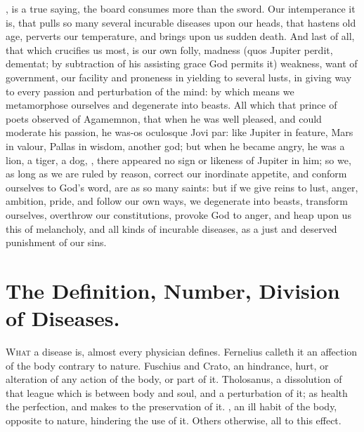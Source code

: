 {, is a true saying, the board consumes more
than the sword. Our intemperance it is, that pulls so many several
incurable diseases upon our heads, that hastens old age, perverts
our temperature, and brings upon us sudden death. And last of all, that
which crucifies us most, is our own folly, madness (quos Jupiter
perdit, dementat; by subtraction of his assisting grace God permits it)
weakness, want of government, our facility and proneness in yielding to
several lusts, in giving way to every passion and perturbation of the
mind: by which means we metamorphose ourselves and degenerate into
beasts. All which that prince of poets observed of Agamemnon, that
when he was well pleased, and could moderate his passion, he was-os
oculosque Jovi par: like Jupiter in feature, Mars in valour, Pallas in
wisdom, another god; but when he became angry, he was a lion, a tiger,
a dog, \etc{}, there appeared no sign or likeness of Jupiter in him; so
we, as long as we are ruled by reason, correct our inordinate appetite,
and conform ourselves to God's word, are as so many saints: but if we
give reins to lust, anger, ambition, pride, and follow our own ways, we
degenerate into beasts, transform ourselves, overthrow our
constitutions, provoke God to anger, and heap upon us this of
melancholy, and all kinds of incurable diseases, as a just and deserved
punishment of our sins.

\section{The Definition, Number, Division of Diseases.}

\lettrine{W}{hat} a disease is, almost every physician defines. Fernelius
calleth it an affection of the body contrary to nature. Fuschius
and Crato, an hindrance, hurt, or alteration of any action of the body,
or part of it. Tholosanus, a dissolution of that league which is
between body and soul, and a perturbation of it; as health the
perfection, and makes to the preservation of it. , an ill habit of the body, opposite to nature, hindering the
use of it. Others otherwise, all to this effect.

}
